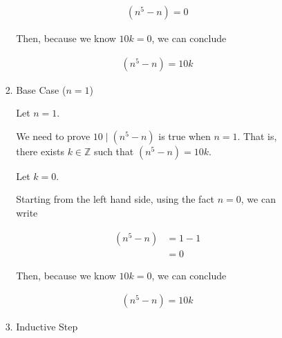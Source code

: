 \documentclass[12pt]{article}
\begin{document}
\begin{itemize}
\begin{itemize}
\begin{itemize}
\begin{mdframed}
\begin{enumerate}[1.]
\begin{mdframed}
                    \begin{align}
                        (n^5 - n) = 0
                    \end{align}

                    \bigskip

                    Then, because we know $10k = 0$, we can conclude

                    \begin{align}
                        (n^5 - n) = 10k
                    \end{align}

                    \end{mdframed}

                    \item Base Case ($n = 1$)

                    \begin{mdframed}

                    Let $n = 1$.

                    \bigskip

                    We need to prove $10 \mid (n^5 - n)$ is true when $n = 1$. That is,
                    there exists $k \in \mathbb{Z}$ such that $(n^5 - n) = 10k$.

                    \bigskip

                    Let $k = 0$.

                    \bigskip

                    Starting from the left hand side, using the fact $n = 0$,
                    we can write

                    \begin{align}
                        (n^5 - n) &= 1 - 1\\
                        &= 0
                    \end{align}

                    \bigskip

                    Then, because we know $10k = 0$, we can conclude

                    \begin{align}
                        (n^5 - n) = 10k
                    \end{align}

                    \end{mdframed}

                    \item Inductive Step


\end{enumerate}
\end{mdframed}
\end{itemize}
\end{itemize}
\end{itemize}
\end{document}
